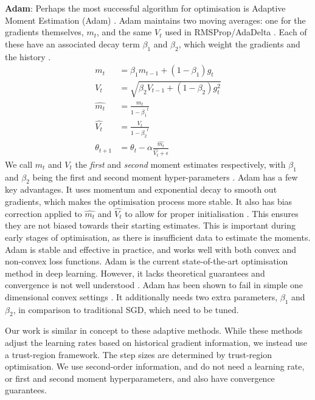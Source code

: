 \textbf{Adam}: Perhaps the most successful algorithm for optimisation is Adaptive Moment Estimation (Adam) \citep{kingma2014adam}. Adam maintains two moving averages: one for the gradients themselves, $m_t$, and the same $V_t$ used in RMSProp/AdaDelta \citep{kingma2014adam}. Each of these have an associated decay term $\beta_1$ and $\beta_2$, which weight the gradients and the history \citep{kingma2014adam}.
\begin{align}
m_t &= \beta_1 m_{t-1} + (1 - \beta_1) g_t \label{eq:m_t} \\
V_t &= \sqrt{\beta_2 V_{t-1} + (1 - \beta_2) g_t^2} \\
\hat{m_t} &= \frac{m_t}{1 - {\beta_1}^t} \\
\hat{V_t} &= \frac{V_t}{1 - {\beta_2}^t} \\
\theta_{t+1} &= \theta_t - \alpha \frac{\hat{m_t}}{{\hat{V_t}} + \epsilon} \label{eq:adam_update}
\end{align}
We call $m_t$ and $V_t$ the \textit{first} and \textit{second} moment estimates respectively, with $\beta_1$ and $\beta_2$ being the first and second moment hyper-parameters \citep{kingma2014adam}. Adam has a few key advantages. It uses momentum and exponential decay to smooth out gradients, which makes the optimisation process more stable. It also has bias correction applied to $\hat{m_t}$ and $\hat{V_t}$ to allow for proper initialisation \citep{kingma2014adam}. This ensures they are not biased towards their starting estimates. This is important during early stages of optimisation, as there is insufficient data to estimate the moments. Adam is stable and effective in practice, and works well with both convex and non-convex loss functions. Adam is the current state-of-the-art optimisation method in deep learning. However, it lacks theoretical guarantees and convergence is not well understood \citep{reddi2019asmgrad}. Adam has been shown to fail in simple one dimensional convex settings \citep{reddi2019asmgrad}. It additionally needs two extra parameters, $\beta_1$ and $\beta_2$, in comparison to traditional SGD, which need to be tuned.

Our work is similar in concept to these adaptive methods. While these methods adjust the learning rates based on historical gradient information, we instead use a trust-region framework. The step sizes are determined by trust-region optimisation. We use second-order information, and do not need a learning rate, or first and second moment hyperparameters, and also have convergence guarantees.

